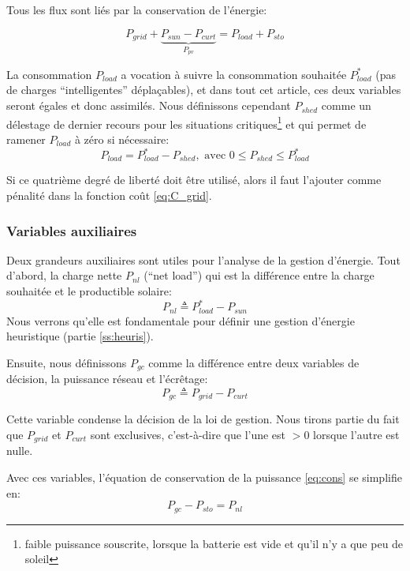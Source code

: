 \documentclass[a4paper,10pt,twocolumn]{article}
\begin{document}
Tous les flux sont liés par la conservation de l'énergie:

\begin{equation} \label{eq:cons}
  P_{grid} + \underbrace{P_{sun} - P_{curt}}_{P_{pv}} = P_{load} + P_{sto}
\end{equation}

La consommation $P_{load}$ a vocation à suivre la consommation souhaitée $P_{load}^*$
(pas de charges ``intelligentes'' déplaçables), et dans tout cet article, ces deux
variables seront égales et donc assimilés.
Nous définissons cependant $P_{shed}$ comme un délestage de dernier
recours pour les situations critiques\footnote{faible puissance souscrite, lorsque
la batterie est vide et qu'il n'y a que peu de soleil} et qui permet
de ramener $P_{load}$ à zéro si nécessaire:
%
\begin{equation}
  P_{load} = P_{load}^* - P_{shed}, \text{ avec } 0 \leq P_{shed} \leq P_{load}^*
\end{equation}

Si ce quatrième degré de liberté doit être utilisé,
alors il faut l'ajouter comme pénalité dans la fonction coût \eqref{eq:C_grid}.

\subsubsection{Variables auxiliaires}
\label{sss:auxi_var}

Deux grandeurs auxiliaires sont utiles pour l'analyse de la gestion d'énergie.
Tout d'abord, la charge nette $P_{nl}$ (``net load'') qui est la différence
entre la charge souhaitée et le productible solaire:
%
\begin{equation}
  P_{nl} \triangleq P_{load}^* - P_{sun}
\end{equation} 
%
Nous verrons qu'elle est fondamentale pour définir une gestion d'énergie heuristique
(partie \ref{ss:heuris}).

Ensuite, nous définissons $P_{gc}$ comme la différence entre deux variables
de décision, la puissance réseau et l'écrêtage:
%
\begin{equation}
  P_{gc} \triangleq P_{grid} - P_{curt}
\end{equation} 

Cette variable condense la décision de la loi de gestion.
Nous tirons partie du fait que $P_{grid}$ et $P_{curt}$ sont exclusives,
c'est-à-dire que l'une est $>0$ lorsque l'autre est nulle.

Avec ces variables, l'équation de conservation de la puissance \eqref{eq:cons}
se simplifie en:
%
\begin{equation} \label{eq:cons2}
  P_{gc} - P_{sto} = P_{nl}
\end{equation}
%
\end{document}
